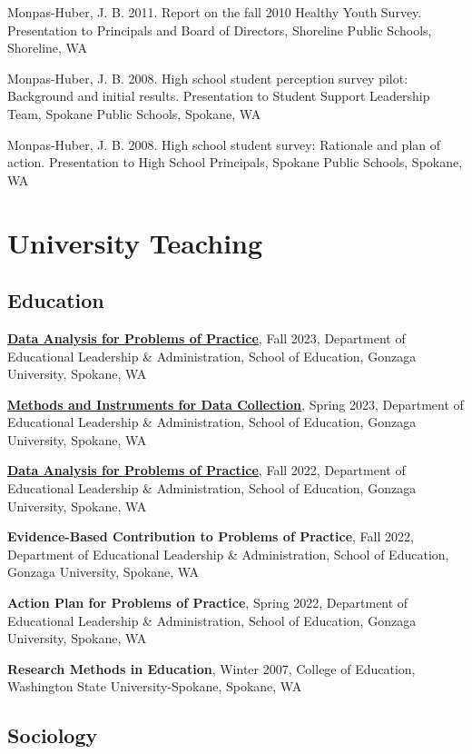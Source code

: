 \documentclass[
  letterpaper,
]{article}
\begin{document}
Monpas-Huber, J. B. 2011. Report on the fall 2010 Healthy Youth Survey.
Presentation to Principals and Board of Directors, Shoreline Public
Schools, Shoreline, WA

Monpas-Huber, J. B. 2008. High school student perception survey pilot:
Background and initial results. Presentation to Student Support
Leadership Team, Spokane Public Schools, Spokane, WA

Monpas-Huber, J. B. 2008. High school student survey: Rationale and plan
of action. Presentation to High School Principals, Spokane Public
Schools, Spokane, WA

\section{University Teaching}\label{university-teaching}

\subsection{Education}\label{education-1}

\href{https://EDLD710.jackhuber.org}{\textbf{Data Analysis for Problems
of Practice}}, Fall 2023, Department of Educational Leadership \&
Administration, School of Education, Gonzaga University, Spokane, WA

\href{https://jackhuber.org/EDLD704}{\textbf{Methods and Instruments for
Data Collection}}, Spring 2023, Department of Educational Leadership \&
Administration, School of Education, Gonzaga University, Spokane, WA

\href{https://jackhuber.org/EDLD710}{\textbf{Data Analysis for Problems
of Practice}}, Fall 2022, Department of Educational Leadership \&
Administration, School of Education, Gonzaga University, Spokane, WA

\textbf{Evidence-Based Contribution to Problems of Practice}, Fall 2022,
Department of Educational Leadership \& Administration, School of
Education, Gonzaga University, Spokane, WA

\textbf{Action Plan for Problems of Practice}, Spring 2022, Department
of Educational Leadership \& Administration, School of Education,
Gonzaga University, Spokane, WA

\textbf{Research Methods in Education}, Winter 2007, College of
Education, Washington State University-Spokane, Spokane, WA

\subsection{Sociology}\label{sociology}
\end{document}

